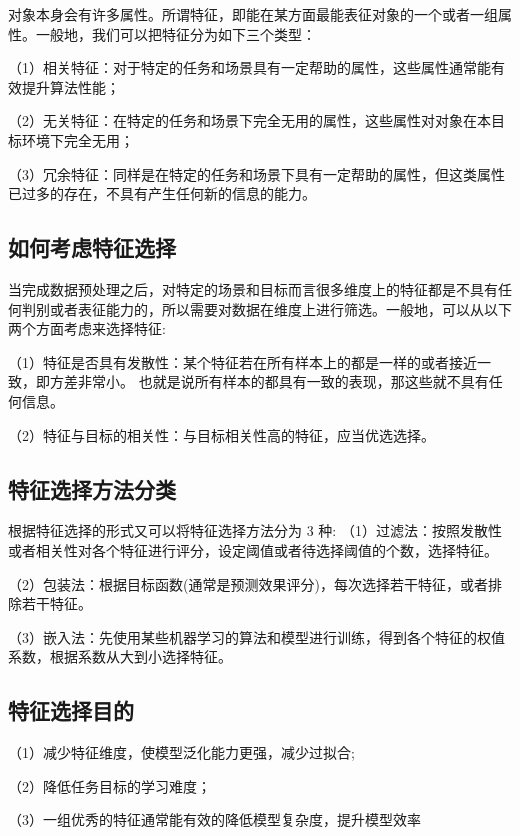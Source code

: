 对象本身会有许多属性。所谓特征，即能在某方面最能表征对象的一个或者一组属性。一般地，我们可以把特征分为如下三个类型：

（1）相关特征：对于特定的任务和场景具有一定帮助的属性，这些属性通常能有效提升算法性能；

（2）无关特征：在特定的任务和场景下完全无用的属性，这些属性对对象在本目标环境下完全无用；

（3）冗余特征：同样是在特定的任务和场景下具有一定帮助的属性，但这类属性已过多的存在，不具有产生任何新的信息的能力。

\subsection{如何考虑特征选择}\label{ux5982ux4f55ux8003ux8651ux7279ux5f81ux9009ux62e9}

当完成数据预处理之后，对特定的场景和目标而言很多维度上的特征都是不具有任何判别或者表征能力的，所以需要对数据在维度上进行筛选。一般地，可以从以下两个方面考虑来选择特征:

（1）特征是否具有发散性：某个特征若在所有样本上的都是一样的或者接近一致，即方差非常小。
也就是说所有样本的都具有一致的表现，那这些就不具有任何信息。

（2）特征与目标的相关性：与目标相关性高的特征，应当优选选择。

\subsection{特征选择方法分类}\label{ux7279ux5f81ux9009ux62e9ux65b9ux6cd5ux5206ux7c7b}

根据特征选择的形式又可以将特征选择方法分为 3 种:
（1）过滤法：按照发散性或者相关性对各个特征进行评分，设定阈值或者待选择阈值的个数，选择特征。

（2）包装法：根据目标函数(通常是预测效果评分)，每次选择若干特征，或者排除若干特征。

（3）嵌入法：先使用某些机器学习的算法和模型进行训练，得到各个特征的权值系数，根据系数从大到小选择特征。

\subsection{特征选择目的}\label{ux7279ux5f81ux9009ux62e9ux76eeux7684}

（1）减少特征维度，使模型泛化能力更强，减少过拟合;

（2）降低任务目标的学习难度；

（3）一组优秀的特征通常能有效的降低模型复杂度，提升模型效率

